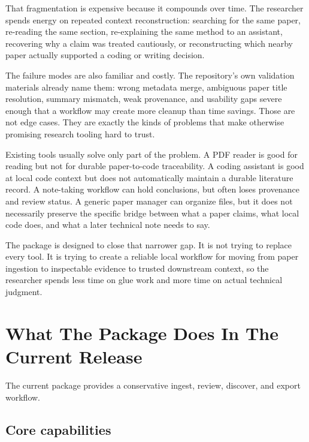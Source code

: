 \documentclass[11pt,a4paper,openany]{book}
\begin{document}
That fragmentation is expensive because it compounds over time. The researcher
spends energy on repeated context reconstruction: searching for the same paper,
re-reading the same section, re-explaining the same method to an assistant,
recovering why a claim was treated cautiously, or reconstructing which nearby
paper actually supported a coding or writing decision.

The failure modes are also familiar and costly. The repository's own validation
materials already name them: wrong metadata merge, ambiguous paper title
resolution, summary mismatch, weak provenance, and usability gaps severe enough
that a workflow may create more cleanup than time savings. Those are not edge
cases. They are exactly the kinds of problems that make otherwise promising
research tooling hard to trust.

Existing tools usually solve only part of the problem. A PDF reader is good for
reading but not for durable paper-to-code traceability. A coding assistant is
good at local code context but does not automatically maintain a durable
literature record. A note-taking workflow can hold conclusions, but often loses
provenance and review status. A generic paper manager can organize files, but it
does not necessarily preserve the specific bridge between what a paper claims,
what local code does, and what a later technical note needs to say.

The package is designed to close that narrower gap. It is not trying to replace
every tool. It is trying to create a reliable local workflow for moving from
paper ingestion to inspectable evidence to trusted downstream context, so the
researcher spends less time on glue work and more time on actual technical
judgment.

\chapter{What The Package Does In The Current Release}

The current package provides a conservative ingest, review, discover, and export
workflow.

\section{Core capabilities}
\end{document}
